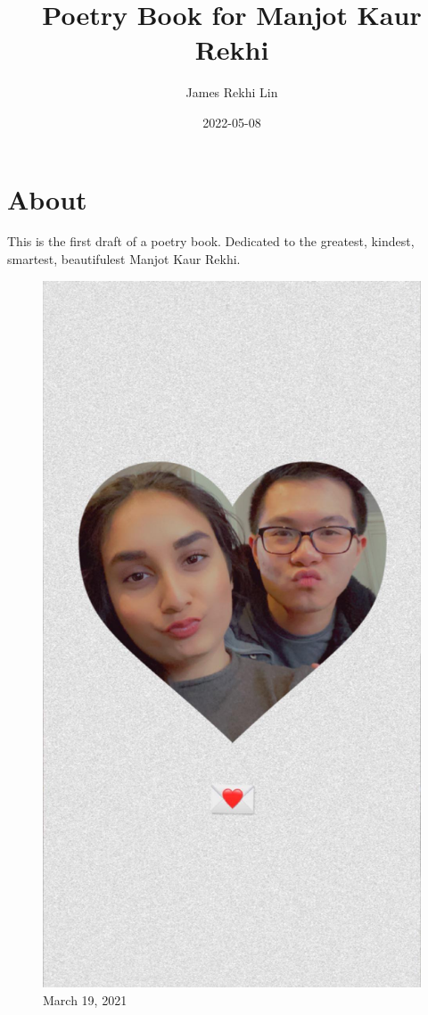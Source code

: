\documentclass[
]{book}
\title{Poetry Book for Manjot Kaur Rekhi}
\author{James Rekhi Lin}
\date{2022-05-08}
\begin{document}
\maketitle

{
\setcounter{tocdepth}{1}
\tableofcontents
}
\hypertarget{about}{%
\chapter{About}\label{about}}

This is the first draft of a poetry book. Dedicated to the greatest, kindest, smartest, beautifulest Manjot Kaur Rekhi.

\begin{figure}
\centering
\includegraphics[width=5.20833in,height=\textheight]{mimages/18 3-19-2021.jpg}
\caption{March 19, 2021}
\end{figure}
\end{document}
